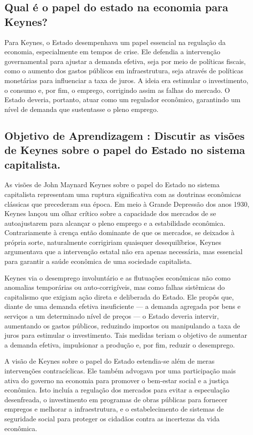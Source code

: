 \documentclass[12pt]{article}
\begin{document}
\subsection{\textbf{Qual é o papel do estado na economia para Keynes?}}
Para Keynes, o Estado desempenhava um papel essencial na regulação da economia, especialmente em tempos de crise. Ele defendia a intervenção governamental para ajustar a demanda efetiva, seja por meio de políticas fiscais, como o aumento dos gastos públicos em infraestrutura, seja através de políticas monetárias para influenciar a taxa de juros. A ideia era estimular o investimento, o consumo e, por fim, o emprego, corrigindo assim as falhas do mercado. O Estado deveria, portanto, atuar como um regulador econômico, garantindo um nível de demanda que sustentasse o pleno emprego.
\subsection{\textbf{Objetivo de Aprendizagem : Discutir as visões de Keynes sobre o papel do Estado no sistema capitalista.}}
As visões de John Maynard Keynes sobre o papel do Estado no sistema capitalista representam uma ruptura significativa com as doutrinas econômicas clássicas que precederam sua época. Em meio à Grande Depressão dos anos 1930, Keynes lançou um olhar crítico sobre a capacidade dos mercados de se autoajustarem para alcançar o pleno emprego e a estabilidade econômica. Contrariamente à crença então dominante de que os mercados, se deixados à própria sorte, naturalmente corrigiriam quaisquer desequilíbrios, Keynes argumentava que a intervenção estatal não era apenas necessária, mas essencial para garantir a saúde econômica de uma sociedade capitalista.

Keynes via o desemprego involuntário e as flutuações econômicas não como anomalias temporárias ou auto-corrigíveis, mas como falhas sistêmicas do capitalismo que exigiam ação direta e deliberada do Estado. Ele propôs que, diante de uma demanda efetiva insuficiente — a demanda agregada por bens e serviços a um determinado nível de preços — o Estado deveria intervir, aumentando os gastos públicos, reduzindo impostos ou manipulando a taxa de juros para estimular o investimento. Tais medidas teriam o objetivo de aumentar a demanda efetiva, impulsionar a produção e, por fim, reduzir o desemprego.

A visão de Keynes sobre o papel do Estado estendia-se além de meras intervenções contracíclicas. Ele também advogava por uma participação mais ativa do governo na economia para promover o bem-estar social e a justiça econômica. Isto incluía a regulação dos mercados para evitar a especulação desenfreada, o investimento em programas de obras públicas para fornecer empregos e melhorar a infraestrutura, e o estabelecimento de sistemas de seguridade social para proteger os cidadãos contra as incertezas da vida econômica.
\end{document}
